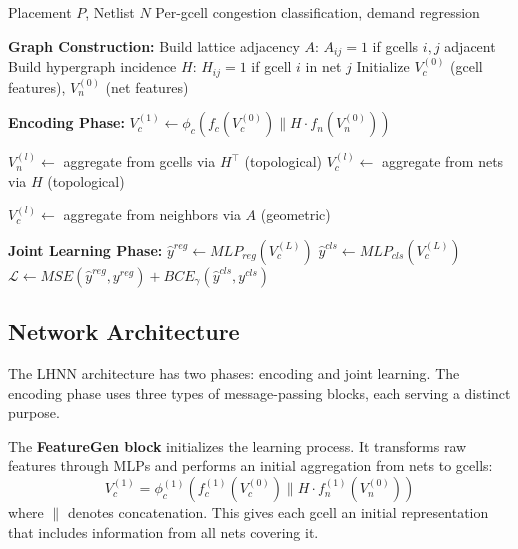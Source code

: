 \documentclass[sigconf]{acmart}
\begin{document}
\begin{algorithm}[h]
\caption{LHNN Congestion Prediction}
\label{alg:lhnn}
\begin{algorithmic}[1]
\Require Placement $P$, Netlist $N$
\Ensure Per-gcell congestion classification, demand regression

\State \textbf{Graph Construction:}
\State Build lattice adjacency $A$: $A_{ij}=1$ if gcells $i,j$ adjacent
\State Build hypergraph incidence $H$: $H_{ij}=1$ if gcell $i$ in net $j$
\State Initialize $V_c^{(0)}$ (gcell features), $V_n^{(0)}$ (net features)

\State \textbf{Encoding Phase:}
\State $V_c^{(1)} \gets \phi_c(f_c(V_c^{(0)}) \| H \cdot f_n(V_n^{(0)}))$ 

 
    \State $V_n^{(l)} \gets$ aggregate from gcells via $H^\top$ (topological)
    \State $V_c^{(l)} \gets$ aggregate from nets via $H$ (topological)
\EndFor

 
    \State $V_c^{(l)} \gets$ aggregate from neighbors via $A$ (geometric)
\EndFor

\State \textbf{Joint Learning Phase:}
\State $\hat{y}^{reg} \gets MLP_{reg}(V_c^{(L)})$ 
\State $\hat{y}^{cls} \gets MLP_{cls}(V_c^{(L)})$ 
\State $\mathcal{L} \gets MSE(\hat{y}^{reg}, y^{reg}) + BCE_\gamma(\hat{y}^{cls}, y^{cls})$
\end{algorithmic}
\end{algorithm}

\subsection{Network Architecture}

The LHNN architecture has two phases: encoding and joint learning. 
The encoding phase uses three types of message-passing blocks, each 
serving a distinct purpose.

The \textbf{FeatureGen block} initializes the learning process. It 
transforms raw features through MLPs and performs an initial aggregation 
from nets to gcells:
\begin{equation}
V_c^{(1)} = \phi_c^{(1)}\left(f_c^{(1)}(V_c^{(0)}) \| H \cdot f_n^{(1)}(V_n^{(0)})\right)
\end{equation}
where $\|$ denotes concatenation. This gives each gcell an initial 
representation that includes information from all nets covering it.
\end{document}
